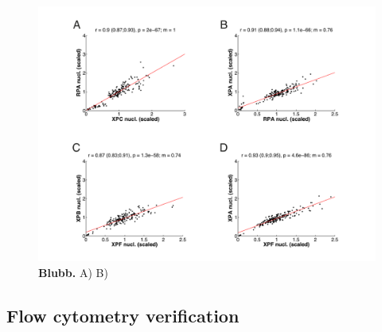 \begin{figure}[htbp]
	\begin{center}
		\includegraphics[width=1\textwidth]{Abbildungen/figure4_3.pdf}
		\caption{\textbf{Blubb.} A) B) }
		\label{fig:coExpressionData_woDamage}
	\end{center}
\end{figure}

\subsection{Flow cytometry verification}

